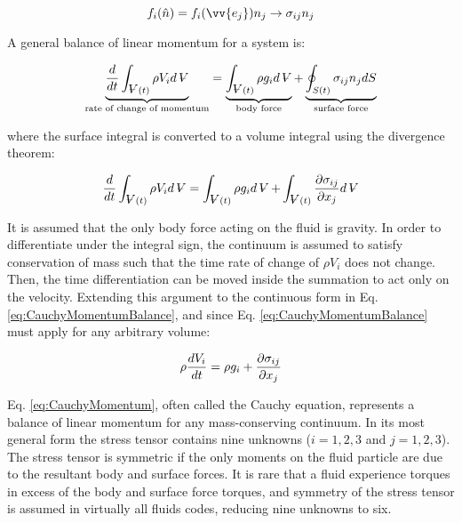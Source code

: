 \documentclass[10pt]{article}
\newcommand{\volume}{\mathop{\ooalign{\hfil$V$\hfil\cr\kern0.08em--\hfil\cr}}\nolimits}
\numberwithin{equation}{section} %
\begin{document}
\begin{equation}
\label{eq:StressTensorDefinition}
f_i(\hat{n})=f_i(\vv{e_j})n_j\rightarrow\sigma_{ij}n_j
\end{equation}

A general balance of linear momentum for a system is:

\begin{equation}
\underbrace{\frac{d}{dt}\int_{\volume(t)}^{}\rho V_id\volume}_{\text{rate of change of momentum}}=\underbrace{\int_{\volume(t)}^{}\rho g_id\volume}_{\text{body force}}+\underbrace{\oint_{S(t)}^{}\sigma_{ij}n_jdS}_{\text{surface force}}
\end{equation}

where the surface integral is converted to a volume integral using the divergence theorem:

\begin{equation}
\label{eq:CauchyMomentumBalance}
\frac{d}{dt}\int_{\volume(t)}^{}\rho V_id\volume=\int_{\volume(t)}^{}\rho g_id\volume+\int_{\volume(t)}^{}\frac{\partial\sigma_{ij}}{\partial x_j}d\volume
\end{equation}

It is assumed that the only body force acting on the fluid is gravity. In order to differentiate under the integral sign, the continuum is assumed to satisfy conservation of mass such that the time rate of change of \(\rho V_i\) does not change. Then, the time differentiation can be moved inside the summation to act only on the velocity. Extending this argument to the continuous form in Eq. \eqref{eq:CauchyMomentumBalance}, and since Eq. \eqref{eq:CauchyMomentumBalance} must apply for any arbitrary volume:

\begin{equation}
\label{eq:CauchyMomentum}
\rho\frac{dV_i}{dt}=\rho g_i+\frac{\partial\sigma_{ij}}{\partial x_j}\\
\end{equation}

Eq. \eqref{eq:CauchyMomentum}, often called the Cauchy equation, represents a balance of linear momentum for any mass-conserving continuum. In its most general form the stress tensor contains nine unknowns (\(i=1, 2, 3\) and \(j=1, 2, 3\)). The stress tensor is symmetric if the only moments on the fluid particle are due to the resultant body and surface forces. It is rare that a fluid experience torques in excess of the body and surface force torques, and symmetry of the stress tensor is assumed in virtually all fluids codes, reducing nine unknowns to six. 
\end{document}
